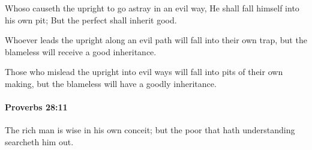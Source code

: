 			\begin{versebox}
					\item[BHS] 
					\item[ASV] Whoso causeth the upright to go astray in an evil way, He shall fall himself into his own pit; But the perfect shall inherit good.
					\item[NIV] Whoever leads the upright along an evil path will fall into their own trap, but the blameless will receive a good inheritance.
					\item[NRSV] Those who mislead the upright into evil ways will fall into pits of their own making, but the blameless will have a goodly inheritance.
			\end{versebox}

		\paragraph{Proverbs 28:11} %
			\label{PROVERBS-28-11}

			The rich man is wise in his own conceit; but the poor that hath understanding searcheth him out.


